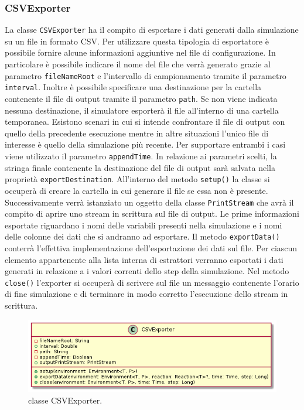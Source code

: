 \documentclass[12pt,a4paper,openright,oneside]{book}
\begin{document}
\subsubsection{CSVExporter}
La classe \texttt{CSVExporter} ha il compito di esportare i dati generati dalla simulazione su un file in formato CSV.
Per utilizzare questa tipologia di esportatore è possibile fornire alcune informazioni aggiuntive nel file di configurazione. 
In particolare è possibile indicare il nome del file che verrà generato grazie al parametro \texttt{fileNameRoot} e l'intervallo di campionamento tramite il parametro \texttt{interval}.
Inoltre è possibile specificare una destinazione per la cartella contenente il file di output tramite il parametro \texttt{path}. Se non viene indicata nessuna destinazione, il simulatore esporterà il file all'interno di una cartella temporanea.
Esistono scenari in cui si intende confrontare il file di output con quello della precedente esecuzione mentre in altre situazioni l'unico file di interesse è quello della simulazione più recente. Per supportare entrambi i casi viene utilizzato il parametro \texttt{appendTime}.
In relazione ai parametri scelti, la stringa finale contenente la destinazione del file di output sarà salvata nella proprietà \texttt{exportDestination}. 
All'interno del  metodo \texttt{setup()} la classe si occuperà di creare la cartella in cui generare il file se essa non è presente. Successivamente verrà istanziato un oggetto della classe \texttt{PrintStream} che avrà il compito di aprire uno stream in scrittura sul file di output. Le prime informazioni esportate riguardano i nomi delle variabili presenti nella simulazione e i nomi delle colonne dei dati che si andranno ad esportare.
Il metodo \texttt{exportData()} conterrà l'effettiva implementazione dell'esportazione dei dati sul file. Per ciascun elemento appartenente alla lista interna di estrattori verranno esportati i dati generati in relazione a i valori correnti dello step della simulazione. Nel metodo \texttt{close()} l'exporter si occuperà di scrivere sul file un messaggio contenente l'orario di fine simulazione e di terminare in modo corretto l'esecuzione dello stream in scrittura.

\begin{figure}
	\centering
	\includegraphics[width=1\linewidth]{images/csvexporter.png}
	\caption{classe CSVExporter.}
	\label{fig:csv-exporter}
\end{figure}
\end{document}
